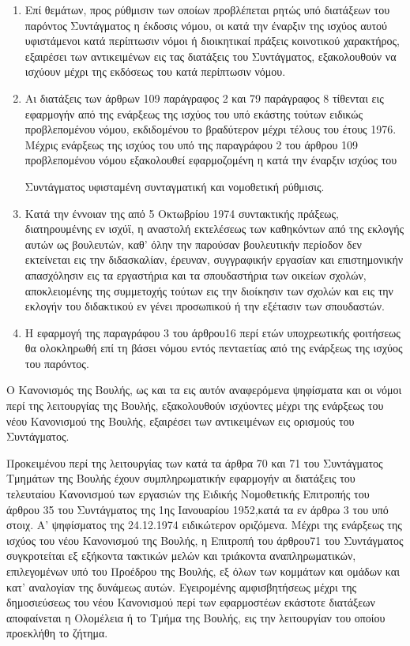 \documentclass[twoside, a4paper, 10pt]{article}
\begin{document}
\begin{multicols}{2}
\begin{enumerate}
\begin{BigQuote}
\begin{enumerate}
  \item[1.] Επί θεμάτων, προς ρύθμισιν των οποίων προβλέπεται ρητώς υπό διατάξεων του παρόντος Συντάγματος η έκδοσις νόμου, οι κατά την έναρξιν της ισχύος αυτού υφιστάμενοι κατά περίπτωσιν νόμοι ή διοικητικαί πράξεις κοινοτικού χαρακτήρος, εξαιρέσει των αντικειμένων εις τας διατάξεις του Συντάγματος, εξακολουθούν να ισχύουν μέχρι της εκδόσεως του κατά περίπτωσιν νόμου.
  \item[2.] Αι διατάξεις των άρθρων 109 παράγραφος 2 και 79 παράγραφος 8 τίθενται εις εφαρμογήν από της ενάρξεως της ισχύος του υπό εκάστης τούτων ειδικώς προβλεπομένου νόμου, εκδιδομένου το βραδύτερον μέχρι τέλους του έτους 1976. Μέχρις ενάρξεως της ισχύος του υπό της παραγράφου 2 του άρθρου 109 προβλεπομένου νόμου εξακολουθεί εφαρμοζομένη η κατά την έναρξιν ισχύος του 

Συντάγματος υφισταμένη συνταγματική και νομοθετική ρύθμισις.
  \item[3.] Κατά την έννοιαν της από 5 Οκτωβρίου 1974 συντακτικής πράξεως, διατηρουμένης εν ισχύϊ, η αναστολή εκτελέσεως των καθηκόντων από της εκλογής αυτών ως βουλευτών, καθ' όλην την παρούσαν βουλευτικήν περίοδον δεν εκτείνεται εις την διδασκαλίαν, έρευναν, συγγραφικήν εργασίαν και επιστημονικήν απασχόλησιν εις τα εργαστήρια και τα σπουδαστήρια των οικείων σχολών, αποκλειομένης της συμμετοχής τούτων εις την διοίκησιν των σχολών και εις την εκλογήν του διδακτικού εν γένει προσωπικού ή την εξέτασιν των σπουδαστών. 
  \item[4.] Η εφαρμογή της παραγράφου 3 του άρθρου16 περί ετών υποχρεωτικής φοιτήσεως θα ολοκληρωθή επί τη βάσει νόμου εντός πενταετίας από της ενάρξεως της ισχύος του παρόντος.
\end{enumerate}

Ο Κανονισμός της Βουλής, ως και τα εις αυτόν αναφερόμενα ψηφίσματα και οι νόμοι περί της λειτουργίας της Βουλής, εξακολουθούν ισχύοντες μέχρι της ενάρξεως του νέου Κανονισμού της Βουλής, εξαιρέσει των αντικειμένων εις ορισμούς του Συντάγματος.

	Προκειμένου περί της λειτουργίας των κατά τα άρθρα 70 και 71 του Συντάγματος Τμημάτων της Βουλής έχουν συμπληρωματικήν εφαρμογήν αι διατάξεις του τελευταίου Κανονισμού των εργασιών της Ειδικής Νομοθετικής Επιτροπής του άρθρου 35 του Συντάγματος της 1ης Ιανουαρίου 1952,κατά τα εν άρθρω 3 του υπό στοιχ. Α' ψηφίσματος της 24.12.1974 ειδικώτερον οριζόμενα. Μέχρι της ενάρξεως της ισχύος του νέου Κανονισμού της Βουλής, η Επιτροπή του άρθρου71 του Συντάγματος συγκροτείται εξ εξήκοντα τακτικών μελών και τριάκοντα αναπληρωματικών, επιλεγομένων υπό του Προέδρου της Βουλής, εξ όλων των κομμάτων και ομάδων και κατ' αναλογίαν της δυνάμεως αυτών. Εγειρομένης αμφισβητήσεως μέχρι της δημοσιεύσεως του νέου Κανονισμού περί των εφαρμοστέων εκάστοτε διατάξεων αποφαίνεται η Ολομέλεια ή το Τμήμα της Βουλής, εις την λειτουργίαν του οποίου προεκλήθη το ζήτημα.
	

\end{BigQuote}
\end{enumerate}
\end{multicols}
\end{document}
